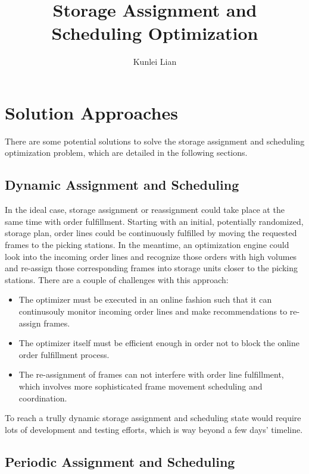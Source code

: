 \documentclass[a4, 11pt]{article}
\begin{document}
\title{\vspace{-4cm}Storage Assignment and Scheduling Optimization}
\author{Kunlei Lian}
\maketitle


\section{Solution Approaches}

There are some potential solutions to solve the storage assignment and scheduling optimization problem, which are detailed in the following sections.

\subsection{Dynamic Assignment and Scheduling}

In the ideal case, storage assignment or reassignment could take place at the same time with order fulfillment.
Starting with an initial, potentially randomized, storage plan, order lines could be continuously fulfilled by moving the requested frames to the picking stations.
In the meantime, an optimization engine could look into the incoming order lines and recognize those orders with high volumes and re-assign those corresponding frames into storage units closer to the picking stations.
There are a couple of challenges with this approach:

\begin{itemize}
	\item The optimizer must be executed in an online fashion such that it can continusouly monitor incoming order lines and make recommendations to re-assign frames.
	\item The optimizer itself must be efficient enough in order not to block the online order fulfillment process. 
	\item The re-assignment of frames can not interfere with order line fulfillment, which involves more sophisticated frame movement scheduling and coordination.
\end{itemize}

To reach a trully dynamic storage assignment and scheduling state would require lots of development and testing efforts, which is way beyond a few days' timeline.

\subsection{Periodic Assignment and Scheduling}
	
\end{document}
